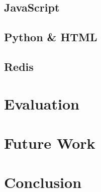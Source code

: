\documentclass[letterpaper,twocolumn,10pt,draft]{article}
\begin{document}
\subsection{\label{sec:impl:js}JavaScript}

\subsection{\label{sec:impl:pyhtml}Python \& HTML}

\subsection{\label{sec:impl:redis}Redis}

\section{\label{sec:eval}Evaluation}

\section{\label{sec:fw}Future Work}

\section{\label{sec:con}Conclusion}

%
%
%
%
%

{\footnotesize
    
    }
\end{document}
